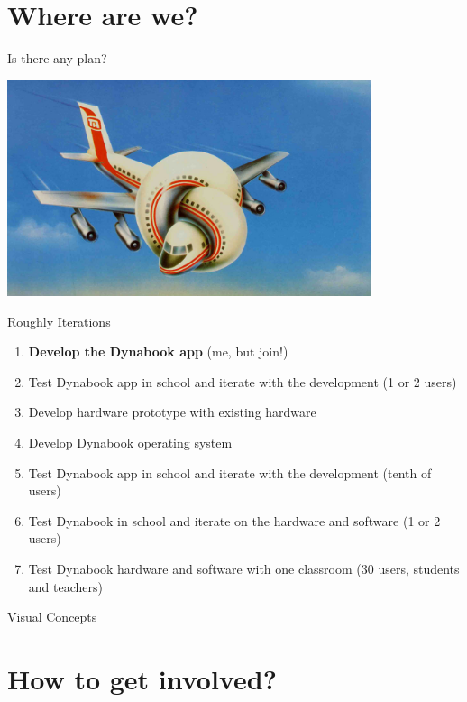 \documentclass{beamer}
\begin{document}
\section{Where are we?}
\begin{frame}{Is there any plan?}
\begin{center}
  \includegraphics[width=0.8\textwidth]{anyPilot.jpeg}
\end{center}
\end{frame}
\begin{frame}{Roughly}
  Iterations
  \begin{enumerate}
  \item \textbf{Develop the Dynabook app} (me, but join!)
  \item Test Dynabook app in school and iterate with the development (1 or 2 users)
  \item Develop hardware prototype with existing hardware
  \item Develop Dynabook operating system
  \item Test Dynabook app in school and iterate with the development (tenth of users)
  \item Test Dynabook in school and iterate on the hardware and software (1 or 2 users)
  \item Test Dynabook hardware and software with one classroom (30 users, students and teachers)
  \end{enumerate}
\end{frame}

\begin{frame}{Visual Concepts}
  
\end{frame}


\section{How to get involved?}
\end{document}
